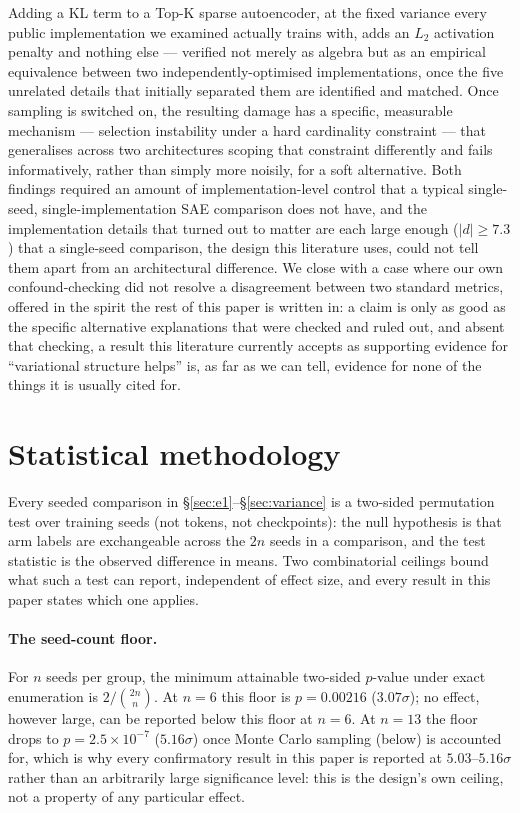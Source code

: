 \documentclass[11pt]{article}
\begin{document}
Adding a KL term to a Top-K sparse autoencoder, at the fixed variance every
public implementation we examined actually trains with, adds an $L_2$
activation penalty and nothing else --- verified not merely as algebra but
as an empirical equivalence between two independently-optimised
implementations, once the five unrelated details that initially separated
them are identified and matched. Once sampling is switched on, the resulting
damage has a specific, measurable mechanism --- selection instability under a
hard cardinality constraint --- that generalises across two architectures
scoping that constraint differently and fails informatively, rather than
simply more noisily, for a soft alternative. Both findings required an
amount of implementation-level control that a typical single-seed,
single-implementation SAE comparison does not have, and the implementation
details that turned out to matter are each large enough ($|d|\ge7.3$) that a
single-seed comparison, the design this literature uses, could not tell them
apart from an architectural difference. We close with a case where our own confound-checking did
not resolve a disagreement between two standard metrics, offered in the
spirit the rest of this paper is written in: a claim is only as good as the
specific alternative explanations that were checked and ruled out, and
absent that checking, a result this literature currently accepts as
supporting evidence for ``variational structure helps'' is, as far as we can
tell, evidence for none of the things it is usually cited for.




\appendix

\section{Statistical methodology}
\label{app:stats}

Every seeded comparison in \S\ref{sec:e1}--\S\ref{sec:variance} is a
two-sided permutation test over training seeds (not tokens, not
checkpoints): the null hypothesis is that arm labels are exchangeable across
the $2n$ seeds in a comparison, and the test statistic is the observed
difference in means. Two combinatorial ceilings bound what such a test can
report, independent of effect size, and every result in this paper states
which one applies.

\paragraph{The seed-count floor.} For $n$ seeds per group, the minimum
attainable two-sided $p$-value under exact enumeration is
$2/\binom{2n}{n}$. At $n=6$ this floor is $p=0.00216$ ($3.07\sigma$); no
effect, however large, can be reported below this floor at $n=6$. At $n=13$
the floor drops to $p=2.5\times10^{-7}$ ($5.16\sigma$) once Monte Carlo
sampling (below) is accounted for, which is why every confirmatory result in
this paper is reported at $5.03$--$5.16\sigma$ rather than an arbitrarily
large significance level: this is the design's own ceiling, not a property
of any particular effect.
\end{document}
